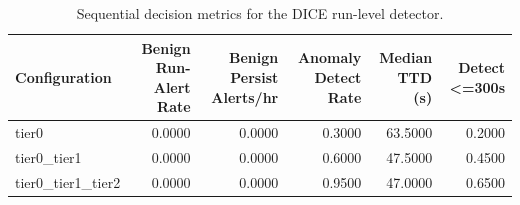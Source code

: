 \begin{table}[t]
\centering
\caption{Sequential decision metrics for the DICE run-level detector.}
\label{tab:dice_sequential_metrics}
\footnotesize
\begin{tabular}{lrrrrr}
\toprule
Configuration & Benign Run-Alert Rate & Benign Persist Alerts/hr & Anomaly Detect Rate & Median TTD (s) & Detect <=300s \\
\midrule
tier0 & 0.0000 & 0.0000 & 0.3000 & 63.5000 & 0.2000 \\
tier0_tier1 & 0.0000 & 0.0000 & 0.6000 & 47.5000 & 0.4500 \\
tier0_tier1_tier2 & 0.0000 & 0.0000 & 0.9500 & 47.0000 & 0.6500 \\
\bottomrule
\end{tabular}

\end{table}
